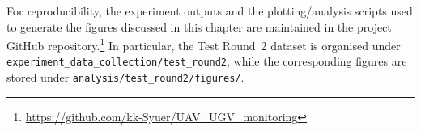 For reproducibility, the experiment outputs and the plotting/analysis scripts used to
generate the figures discussed in this chapter are maintained in the project GitHub
repository.\footnote{\url{https://github.com/kk-Syuer/UAV_UGV_monitoring}} In
particular, the Test Round~2 dataset is organised under
\texttt{experiment\_data\_collection/test\_round2}, while the corresponding figures are
stored under \texttt{analysis/test\_round2/figures/}.










